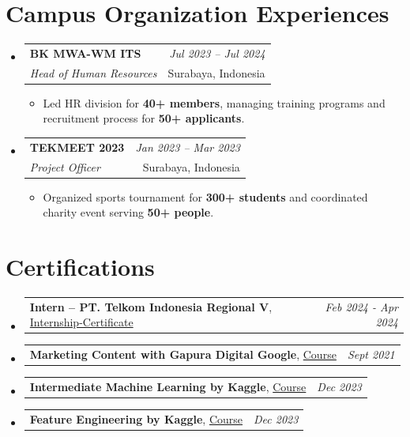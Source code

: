 \documentclass[a4paper,11pt]{article}
\makeatletter
\newcommand{\resumeItemMain}[1]{
  \item #1
}
\newcommand{\resumePOR}[3]{
\vspace{0.5mm}\item
    \begin{tabular*}{0.97\textwidth}[t]{l@{\extracolsep{\fill}}r}
        \textbf{#1}\hspace{0.3mm}#2 & \textit{\small{#3}} 
    \end{tabular*}
    \vspace{-2mm}
}
\newcommand{\resumeSubheading}[4]{
\vspace{0.5mm}\item
    \begin{tabular*}{0.98\textwidth}[t]{l@{\extracolsep{\fill}}r}
        \textbf{#1} & \textit{\footnotesize{#4}} \\
        \textit{\footnotesize{#3}} & \footnotesize{#2} \\
    \end{tabular*}
    \vspace{-2.4mm}
}
\newcommand{\resumeSubHeadingListStart}{\begin{itemize}[leftmargin=*,labelsep=0.1mm]}
\newcommand{\resumeItemListStart}{\begin{itemize}[leftmargin=*,labelsep=1mm,itemsep=0.5mm]}
\newcommand{\resumeSubHeadingListEnd}{\end{itemize}\vspace{2mm}}
\newcommand{\resumeItemListEnd}{\end{itemize}\vspace{-2mm}}
\makeatother
\begin{document}
\section{\textbf{Campus Organization Experiences}}
\vspace{-0.4mm}
\resumeSubHeadingListStart
\resumeSubheading
    {BK MWA-WM ITS}{Surabaya, Indonesia}
    {Head of Human Resources}{Jul 2023 – Jul 2024}
    \resumeItemListStart
        \resumeItemMain{Led HR division for \textbf{40+ members}, managing training programs and recruitment process for \textbf{50+ applicants}.}
    \resumeItemListEnd
\resumeSubheading
    {TEKMEET 2023}{Surabaya, Indonesia}
    {Project Officer}{Jan 2023 – Mar 2023}
    \resumeItemListStart
        \resumeItemMain{Organized sports tournament for \textbf{300+ students} and coordinated charity event serving \textbf{50+ people}.}
    \resumeItemListEnd
\resumeSubHeadingListEnd
\vspace{-6mm}

\section{\textbf{Certifications}}
\vspace{-0.4mm}
\resumeSubHeadingListStart
\resumePOR
    {Intern – PT. Telkom Indonesia Regional V} %
    {, \href{https://drive.google.com/file/d/1-nwVQKJeIozZTcpPC5dgL05BCwOs9G52/view?usp=sharing}{Internship-Certificate}} %
    {Feb 2024 - Apr 2024} %
\resumePOR
    {Marketing Content with Gapura Digital Google} %
    {, \href{https://drive.google.com/file/d/14aI4HshF3DZK0YVp-r2IjDUmXmzBtc64/view?usp=sharing}{Course}} %
    {Sept 2021} %
\resumePOR
    {Intermediate Machine Learning by Kaggle} %
    {, \href{https://drive.google.com/file/d/10e7CyfwJeKg05ooD73OZsyuTeGxPadMf/view?usp=drive_link}{Course}} %
    {Dec 2023} %
\resumePOR
    {Feature Engineering by Kaggle} %
    {, \href{https://drive.google.com/file/d/1_ewhJnumW4lnMLSV74YxCJEBM53T57YN/view?usp=sharing}{Course}} %
    {Dec 2023} %
\resumeSubHeadingListEnd
\end{document}
